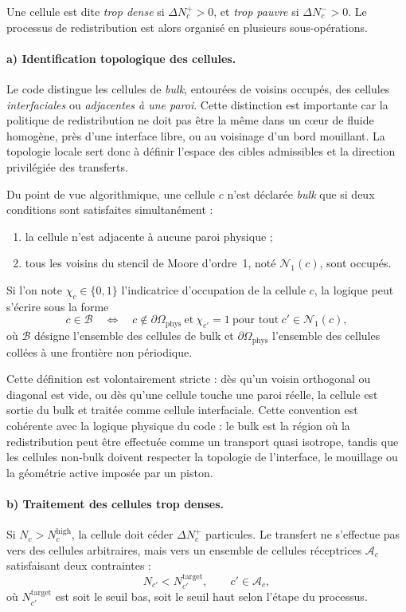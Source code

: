 \documentclass[11pt,a4paper]{article}
\begin{document}
Une cellule est dite \emph{trop dense} si $\Delta N_c^{+}>0$, et \emph{trop pauvre} si $\Delta N_c^{-}>0$. Le processus de redistribution est alors organisé en plusieurs sous-opérations.

\paragraph{a) Identification topologique des cellules.}
Le code distingue les cellules de \emph{bulk}, entourées de voisins occupés, des cellules \emph{interfaciales} ou \emph{adjacentes à une paroi}. Cette distinction est importante car la politique de redistribution ne doit pas être la même dans un cœur de fluide homogène, près d'une interface libre, ou au voisinage d'un bord mouillant. La topologie locale sert donc à définir l'espace des cibles admissibles et la direction privilégiée des transferts.

Du point de vue algorithmique, une cellule $c$ n'est déclarée \emph{bulk} que si deux conditions sont satisfaites simultanément :
\begin{enumerate}[label=(\roman*)]
  \item la cellule n'est adjacente à aucune paroi physique ;
  \item tous les voisins du stencil de Moore d'ordre~1, noté $\mathcal{N}_1(c)$, sont occupés.
\end{enumerate}
Si l'on note $\chi_c\in\{0,1\}$ l'indicatrice d'occupation de la cellule $c$, la logique peut s'écrire sous la forme
\begin{equation}
  c\in\mathcal{B}
  \quad \Longleftrightarrow \quad
  c\notin\partial\Omega_{\mathrm{phys}}
  \ \text{et}\
  \chi_{c'}=1 \ \text{pour tout}\ c'\in\mathcal{N}_1(c),
\end{equation}
où $\mathcal{B}$ désigne l'ensemble des cellules de bulk et $\partial\Omega_{\mathrm{phys}}$ l'ensemble des cellules collées à une frontière non périodique.

Cette définition est volontairement stricte : dès qu'un voisin orthogonal ou diagonal est vide, ou dès qu'une cellule touche une paroi réelle, la cellule est sortie du bulk et traitée comme cellule interfaciale. Cette convention est cohérente avec la logique physique du code : le bulk est la région où la redistribution peut être effectuée comme un transport quasi isotrope, tandis que les cellules non-bulk doivent respecter la topologie de l'interface, le mouillage ou la géométrie active imposée par un piston.

\paragraph{b) Traitement des cellules trop denses.}
Si $N_c > N_c^{\mathrm{high}}$, la cellule doit céder $\Delta N_c^{+}$ particules. Le transfert ne s'effectue pas vers des cellules arbitraires, mais vers un ensemble de cellules réceptrices $\mathcal{A}_c$ satisfaisant deux contraintes :
\begin{equation}
  N_{c'} < N_{c'}^{\mathrm{target}},
  \qquad c'\in\mathcal{A}_c,
\end{equation}
où $N_{c'}^{\mathrm{target}}$ est soit le seuil bas, soit le seuil haut selon l'étape du processus.
\end{document}
